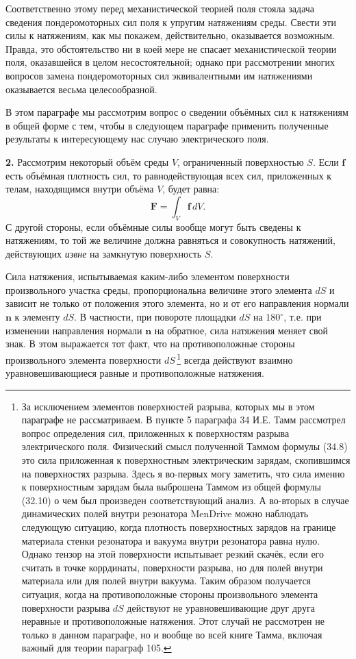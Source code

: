 \documentclass[a4paper,10pt]{article}
\newcommand{\redtext}[1]{\textcolor{redcolor}{#1}}
\newcommand{\modtext}[1]{\textcolor{modcolor}{#1}}
\begin{document}
Соответственно этому перед механистической теорией поля стояла задача
сведения пондеромоторных сил поля к упругим натяжениям среды. Свести
эти силы к натяжениям, как мы покажем, действительно, оказывается
возможным. Правда, это обстоятельство ни в коей мере не спасает
механистической теории поля, оказавшейся в целом несостоятельной;
однако при рассмотрении многих вопросов замена пондеромоторных сил
эквивалентными им натяжениями оказывается весьма целесообразной.

В этом параграфе мы рассмотрим вопрос о сведении объёмных сил
к натяжениям в общей форме с тем, чтобы в следующем параграфе применить
полученные результаты к интересующему нас случаю электрического поля.

\textbf{2.} Рассмотрим некоторый объём среды $V$, ограниченный
поверхностью $S$. Если $\mathbf{f}$ есть объёмная плотность сил, то
равнодействующая всех сил, приложенных к телам, находящимся внутри
объёма $V$, будет равна:
\begin{equation}
    \mathbf{F} = \int_V \mathbf{f}\,dV.
    \tag{33.1}
\end{equation}
С другой стороны, \redtext{если объёмные силы вообще могут быть сведены
к натяжениям}, то той же величине должна равняться и совокупность
натяжений, действующих \textit{извне} на замкнутую поверхность $S$.

Сила натяжения, испытываемая каким-либо элементом поверхности
произвольного участка среды, пропорциональна величине этого элемента
$dS$ и зависит не только от положения этого элемента, но и от его
направления нормали $\mathbf{n}$ к элементу $dS$. В частности, при
повороте площадки $dS$ на $180^\circ$, т.е. при изменении направления
нормали $\mathbf{n}$ на обратное, сила натяжения меняет свой знак.
В этом выражается тот факт, что на противоположные стороны
произвольного элемента поверхности $dS$\,\footnote{За исключением
элементов поверхностей разрыва, которых мы в этом параграфе не
рассматриваем. \modtext{В пункте 5 параграфа 34 И.Е. Тамм рассмотрел вопрос определения сил, приложенных к поверхностям разрыва электрического поля. Физический смысл полученной Таммом формулы (34.8) это сила приложенная к поверхностным электрическим зарядам, скопившимся на поверхностях разрыва. Здесь я во-первых могу заметить, что сила именно к поверхностным зарядам была выброшена Таммом из общей формулы (32.10) о чем был произведен соответствующий анализ. А во-вторых в случае динамических полей внутри резонатора MenDrive можно наблюдать следующую ситуацию, когда плотность поверхностных зарядов на границе материала стенки резонатора и вакуума внутри резонатора равна нулю. Однако тензор на этой поверхности испытывает резкий скачёк, если его считать в точке коррдинаты, поверхности разрыва, но для полей внутри материала или для полей внутри вакуума. Таким образом получается ситуация, когда на противоположные стороны
произвольного элемента поверхности разрыва $dS$ действуют не уравновешивающие друг друга неравные
и противоположные натяжения. Этот случай не рассмотрен не только в данном параграфе, но и вообще во всей книге Тамма, включая важный для теории параграф 105.}
} всегда действуют взаимно уравновешивающиеся равные
и противоположные натяжения.
\end{document}
